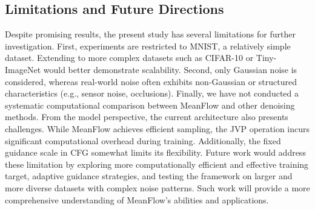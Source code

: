 \subsection{Limitations and Future Directions}

Despite promising results, the present study has several limitations for further investigation. First, experiments are restricted to MNIST, a relatively simple dataset. Extending to more complex datasets such as CIFAR-10 or Tiny-ImageNet would better demonstrate scalability. Second, only Gaussian noise is considered, whereas real-world noise often exhibits non-Gaussian or structured characteristics (e.g., sensor noise, occlusions). Finally, we have not conducted a systematic computational comparison between MeanFlow and other denoising methods. From the model perspective, the current architecture also presents challenges. While MeanFlow achieves efficient sampling, the JVP operation incurs significant computational overhead during training. Additionally, the fixed guidance scale in CFG somewhat limits its flexibility. Future work would address these limitation by exploring more computationally efficient and effective training target, adaptive guidance strategies, and testing the framework on larger and more diverse datasets with complex noise patterns. Such work will provide a more comprehensive understanding of MeanFlow’s abilities and applications.
